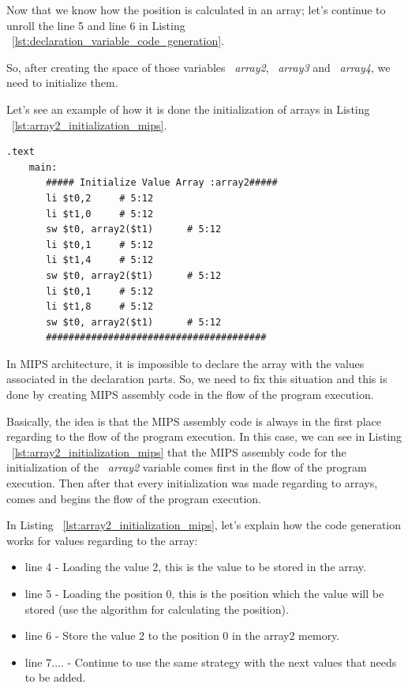 \documentclass[
  oneside,
  11pt, a4paper,
  footinclude=true,
  headinclude=true,
  cleardoublepage=empty
]{scrbook}
\begin{document}
Now that we know how the position is calculated in an array; let's continue to unroll the line 5 and line 6 in Listing ~\ref{lst:declaration_variable_code_generation}.

So, after creating the space of those variables ~\textit{array2}, ~\textit{array3} and ~\textit{array4}, we need to initialize them.

Let's see an example of how it is done the initialization of arrays in Listing ~\ref{lst:array2_initialization_mips}.

\begin{lstlisting}[caption={MIPS assembly code generated for the variable array2},label={lst:array2_initialization_mips}]
  .text
    main:
       ##### Initialize Value Array :array2#####
       li $t0,2		# 5:12
       li $t1,0		# 5:12
       sw $t0, array2($t1)		# 5:12
       li $t0,1		# 5:12
       li $t1,4		# 5:12
       sw $t0, array2($t1)		# 5:12
       li $t0,1		# 5:12
       li $t1,8		# 5:12
       sw $t0, array2($t1)		# 5:12
       #######################################
\end{lstlisting}

In MIPS architecture, it is impossible to declare the array with the values associated in the declaration parts. So, we need to fix this situation and this is done by creating MIPS assembly code in the flow of the program execution.

Basically, the idea is that the MIPS assembly code is always in the first place regarding to the flow of the program execution. In this case, we can see in Listing ~\ref{lst:array2_initialization_mips} that the MIPS assembly code for the initialization of the ~\textit{array2} variable comes first in the flow of the program execution. Then after that every initialization was made regarding to arrays, comes and begins the flow of the program execution.

In Listing ~\ref{lst:array2_initialization_mips}, let's explain how the code generation works for values regarding to the array:

\begin{itemize}
\item line 4 - Loading the value 2, this is the value to be stored in the array.
\item line 5 - Loading the position 0, this is the position which the value will be stored (use the algorithm for calculating the position).
\item line 6 - Store the value 2 to the position 0 in the array2 memory.
\item line 7.... - Continue to use the same strategy with the next values that needs to be added.
\end{itemize}
\end{document}
